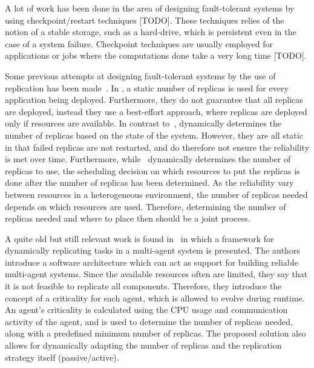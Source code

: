 \documentclass{cslthse-msc}
\begin{document}
A lot of work has been done in the area of designing fault-tolerant systems by using checkpoint/restart techniques [TODO]. %
These techniques relies of the notion of a stable storage, such as a hard-drive, which is persistent even in the case of a system failure. Checkpoint techniques are usually employed for applications or jobs where the computations done take a very long time [TODO].

Some previous attempts at designing fault-tolerant systems by the use of replication has been made~\cite{designFaultTolerantSched, evalReplicationSched, taskSchedulingReplication, effTaskReplMobGrid, relGridServicePredConstraint}. In \cite{evalReplicationSched}, a static number of replicas is used for every application being deployed. Furthermore, they do not guarantee that all replicas are deployed, instead they use a best-effort approach, where replicas are deployed only if resources are available. In contrast to~\cite{evalReplicationSched}, \cite{ effTaskReplMobGrid, taskSchedulingReplication, designFaultTolerantSched} dynamically determines the number of replicas based on the state of the system. However, they are all static in that failed replicas are not restarted, and do therefore not ensure the reliability is met over time. Furthermore, while~\cite{designFaultTolerantSched} dynamically determines the number of replicas to use, the scheduling decision on which resources to put the replicas is done after the number of replicas has been determined. As the reliability vary between resources in a heterogeneous environment, the number of replicas needed depends on which resources are used. Therefore, determining the number of replicas needed and where to place then should be a joint process.

A quite old but still relevant work is found in~\cite{dynAdaptRepl} in which a framework for dynamically replicating tasks in a multi-agent system is presented. The authors introduce a software architecture which can act as support for building reliable multi-agent systems. Since the available resources often are limited, they say that it is not feasible to replicate all components. Therefore, they introduce the concept of a criticality for each agent, which is allowed to evolve during runtime. An agent's criticality is calculated using the CPU usage and communication activity of the agent, and is used to determine the number of replicas needed, along with a predefined minimum number of replicas. The proposed solution also allows for dynamically adapting the number of replicas and the replication strategy itself (passive/active). %
\end{document}
